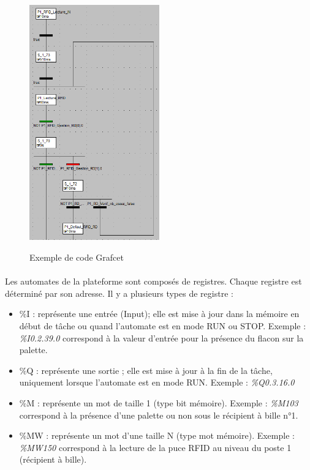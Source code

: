         \begin{figure}[H]
            \centering
            \begin{frame}{\includegraphics[width=0.5\textwidth]{image/grafcet.png}}
            \end{frame}
            \caption{\label{fig:grafcet}Exemple de code Grafcet}
        \end{figure}
        
        \paragraph*{}
        Les automates de la plateforme sont composés de registres. Chaque registre est déterminé par son adresse. Il y a plusieurs types de registre :
        
        \begin{itemize}
        \item \%I : représente une entrée (Input); elle est mise à jour dans la mémoire en début de tâche ou quand l'automate est en mode RUN ou STOP. Exemple : \textit{\%I0.2.39.0} correspond à la valeur d'entrée pour la présence du flacon sur la palette.
        \item \%Q : représente une sortie ; elle est mise à jour à la fin de la tâche, uniquement lorsque l'automate est en mode RUN. Exemple : \textit{\%Q0.3.16.0}
        \item \%M : représente un mot de taille 1 (type bit mémoire). Exemple : \textit{\%M103} correspond à la présence d'une palette ou non sous le récipient à bille n°1.
        \item \%MW : représente un mot d'une taille \textsc{N} (type mot mémoire). Exemple : \textit{\%MW150} correspond à la lecture de la puce RFID au niveau du poste 1 (récipient à bille).
        \end{itemize}
        
